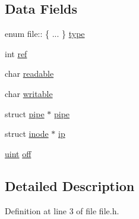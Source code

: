 \subsection*{Data Fields}
\begin{DoxyCompactItemize}
\item 
enum file\-:: \{ ... \}  \hyperlink{structfile_a2872497b673824bb97dd279fe716ce20}{type}
\item 
int \hyperlink{structfile_adb528a1cb1ca190150183394d082590d}{ref}
\item 
char \hyperlink{structfile_a5b131cc3952f1b648059bd61e2f49d99}{readable}
\item 
char \hyperlink{structfile_a46baf97119b7f82a588f0f603451da62}{writable}
\item 
struct \hyperlink{structpipe}{pipe} $\ast$ \hyperlink{structfile_a1e1b96aa86c12eab7047388c6538c051}{pipe}
\item 
struct \hyperlink{structinode}{inode} $\ast$ \hyperlink{structfile_a3ab9ee7e2cad8f73ff4bf973ad8d7713}{ip}
\item 
\hyperlink{types_8h_a91ad9478d81a7aaf2593e8d9c3d06a14}{uint} \hyperlink{structfile_a1aeb2e4b0cfd549f8fb46fb7e08f7e3e}{off}
\end{DoxyCompactItemize}


\subsection{Detailed Description}


Definition at line 3 of file file.\-h.



